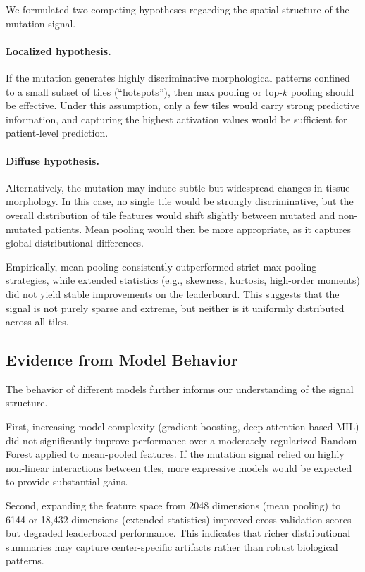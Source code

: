 \documentclass[11pt,a4paper]{article}
\begin{document}
We formulated two competing hypotheses regarding the spatial structure of the mutation signal.

\paragraph{Localized hypothesis.}
If the mutation generates highly discriminative morphological patterns confined to a small subset of tiles (``hotspots''), then max pooling or top-$k$ pooling should be effective. 
Under this assumption, only a few tiles would carry strong predictive information, and capturing the highest activation values would be sufficient for patient-level prediction.

\paragraph{Diffuse hypothesis.}
Alternatively, the mutation may induce subtle but widespread changes in tissue morphology. 
In this case, no single tile would be strongly discriminative, but the overall distribution of tile features would shift slightly between mutated and non-mutated patients. 
Mean pooling would then be more appropriate, as it captures global distributional differences.

Empirically, mean pooling consistently outperformed strict max pooling strategies, while extended statistics (e.g., skewness, kurtosis, high-order moments) did not yield stable improvements on the leaderboard. 
This suggests that the signal is not purely sparse and extreme, but neither is it uniformly distributed across all tiles.

\subsection{Evidence from Model Behavior}

The behavior of different models further informs our understanding of the signal structure.

First, increasing model complexity (gradient boosting, deep attention-based MIL) did not significantly improve performance over a moderately regularized Random Forest applied to mean-pooled features. 
If the mutation signal relied on highly non-linear interactions between tiles, more expressive models would be expected to provide substantial gains.

Second, expanding the feature space from 2048 dimensions (mean pooling) to 6144 or 18,432 dimensions (extended statistics) improved cross-validation scores but degraded leaderboard performance. 
This indicates that richer distributional summaries may capture center-specific artifacts rather than robust biological patterns.
\end{document}
